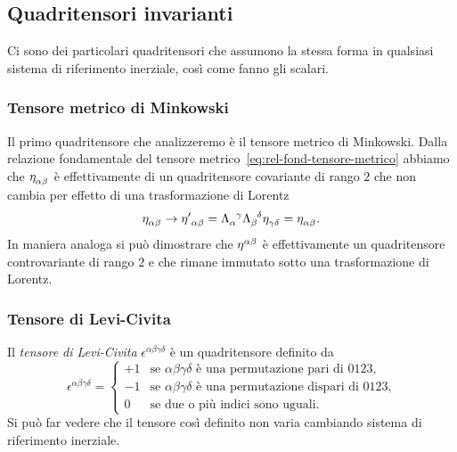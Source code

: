 \subsection{Quadritensori invarianti}
\label{sec:tensori-invarianti-minkowski}

Ci sono dei particolari quadritensori che assumono la stessa forma in qualsiasi
sistema di riferimento inerziale, così come fanno gli scalari.

\subsubsection{Tensore metrico di Minkowski}
\label{sec:tensore-metrico-minkowski}

Il primo quadritensore che analizzeremo è il tensore metrico di Minkowski.
Dalla relazione fondamentale del tensore
metrico~\eqref{eq:rel-fond-tensore-metrico} abbiamo che
$\tensor{\eta}{_{\alpha\beta}}$ è effettivamente di un quadritensore covariante
di rango $2$ che non cambia per effetto di una trasformazione di Lorentz
\begin{equation}
  \tensor{\eta}{_{\alpha\beta}} \to \tensor{{\eta'}}{_{\alpha\beta}} =
  \tensor{\Lambda}{_{\alpha}^{\gamma}} \tensor{\Lambda}{_{\beta}^{\delta}}
  \tensor{\eta}{_{\gamma\delta}} = \tensor{\eta}{_{\alpha\beta}}.
\end{equation}
In maniera analoga si può dimostrare che $\tensor{\eta}{^{\alpha\beta}}$ è
effettivamente un quadritensore controvariante di rango $2$ e che rimane
immutato sotto una trasformazione di Lorentz.

\subsubsection{Tensore di Levi-Civita}
\label{sec:tensore-levi-civita}

Il \emph{tensore di Levi-Civita}
$\epsilon^{\alpha\beta\gamma\delta}$ è un quadritensore definito da
\begin{equation}
  \epsilon^{\alpha\beta\gamma\delta} =
  \begin{cases}
    +1 & \text{se $\alpha\beta\gamma\delta$ è una permutazione pari di $0123$,}
    \\
    -1 & \text{se $\alpha\beta\gamma\delta$ è una permutazione dispari di
      $0123$,} \\
    0 & \text{se due o più indici sono uguali.}
  \end{cases}
\end{equation}
Si può far vedere che il tensore così definito non varia cambiando sistema di
riferimento inerziale.

